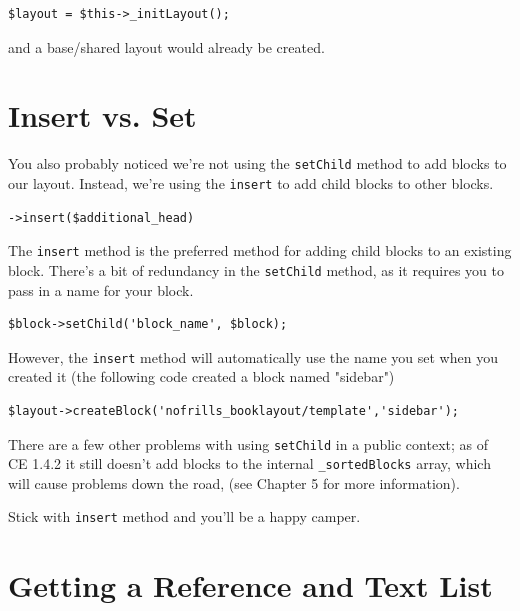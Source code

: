 \documentclass[oneside]{book}
\begin{document}
\begin{lstlisting}
$layout = $this->_initLayout();

\end{lstlisting}


and a base/shared layout would already be created.  

\section{Insert vs. Set}

You also probably noticed we're not using the \footnotesize\texttt{setChild} \normalsize  method to add blocks to our layout.  Instead, we're using the \footnotesize\texttt{insert} \normalsize  to add child blocks to other blocks.

\begin{lstlisting}
->insert($additional_head)

\end{lstlisting}


The \footnotesize\texttt{insert} \normalsize  method is the preferred method for adding child blocks to an existing block.    There's a bit of redundancy in the \footnotesize\texttt{setChild} \normalsize  method, as it requires you to pass in a name for your block.

\begin{lstlisting}
$block->setChild('block_name', $block);

\end{lstlisting}


However, the \footnotesize\texttt{insert} \normalsize  method will automatically use the name you set when you created it (the following code created a block named "sidebar")

\begin{lstlisting}
$layout->createBlock('nofrills_booklayout/template','sidebar');

\end{lstlisting}


There are a few other problems with using \footnotesize\texttt{setChild} \normalsize  in a public context; as of CE 1.4.2 it still doesn't add blocks to the internal \footnotesize\texttt{\_sortedBlocks} \normalsize  array, which will cause problems down the road, (see Chapter 5 for more information).

Stick with \footnotesize\texttt{insert} \normalsize  method and you'll be a happy camper.

\section{Getting a Reference and Text List}
\end{document}
